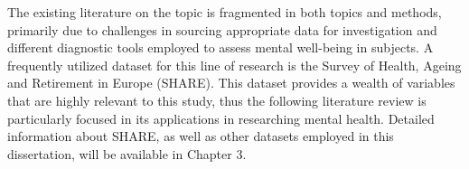 The existing literature on the topic is fragmented in both topics and methods, primarily due to challenges in sourcing appropriate data for investigation and different diagnostic tools employed to assess mental well-being in subjects. 
A frequently utilized dataset for this line of research is the Survey of Health, Ageing and Retirement in Europe (SHARE). This dataset provides a wealth of variables that are highly relevant to this study, thus the following literature review is particularly focused in its applications in researching mental health. Detailed information about SHARE, as well as other datasets employed in this dissertation, will be available in Chapter 3.



















